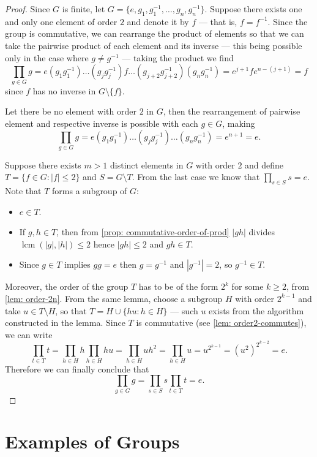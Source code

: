 \begin{proof}
Since \(G\) is finite, let \(G = \{e, g_1, g_1^{-1}, \dots, g_n, g_n^{-1}\}\).
Suppose there exists one and only one element of order \(2\) and denote it by
\(f\) --- that is, \(f = f^{-1}\). Since the group is commutative, we can
rearrange the product of elements so that we can take the pairwise product of
each element and its inverse --- this being possible only in the case where
\(g \neq g^{-1}\) --- taking the product we find
\[
  \prod_{g \in G} g = e (g_1 g_1^{-1}) \dots (g_j g_j^{-1}) f \dots (g_{j + 2}
  g_{j + 2}^{-1}) (g_n g_n^{-1}) = e^{j + 1} f e^{n - (j + 1)} = f
\]
since \(f\) has no inverse in \(G \setminus \{f\}\).

Let there be no element with order \(2\) in \(G\), then the rearrangement of
pairwise element and respective inverse is possible with each \(g \in G\),
making
\[
  \prod_{g \in G} g = e (g_1 g_1^{-1}) \dots (g_j g_j^{-1}) \dots (g_n
  g_n^{-1}) = e^{n + 1} = e.
\]

Suppose there exists \(m > 1\) distinct elements in \(G\) with order \(2\) and
define \(T = \{f \in G \colon |f| \leq 2\}\) and \(S = G \setminus T\). From the
last case we know that \(\prod_{s \in S} s = e\). Note that \(T\) forms a
subgroup of \(G\):
\begin{itemize}
  \item \(e \in T\).
  \item If \(g, h \in T\), then from \cref{prop: commutative-order-of-prod}
    \(|gh|\) divides \(\operatorname{lcm}(|g|, |h|) \leq 2\) hence \(|gh| \leq
    2\) and \(gh \in T\).
  \item Since \(g \in T\) implies \(g g = e\) then \(g = g^{-1}\) and
    \(|g^{-1}| = 2\), so \(g^{-1} \in T\).
\end{itemize}
Moreover, the order of the group \(T\) has to be of the form \(2^k\) for some
\(k \geq 2\), from \cref{lem: order-2n}. From the same lemma, choose a
subgroup \(H\) with order \(2^{k-1}\) and take \(u \in T \setminus H\), so
that \(T = H \cup \{hu \colon h \in H\}\) --- such \(u\) exists from the algorithm
constructed in the lemma. Since \(T\) is commutative (see \cref{lem:
order2-commutes}), we can write
\[
  \prod_{t \in T} t = \prod_{h \in H} h \prod_{h \in H} hu = \prod_{h \in H} u
  h^2 = \prod_{h \in H} u = u^{2^{k-1}} = (u^2)^{2^{k-2}} = e.
\]
Therefore we can finally conclude that
\[
  \prod_{g \in G} g = \prod_{s \in S} s \prod_{t \in T} t = e.
\]
\end{proof}

\section{Examples of Groups}

